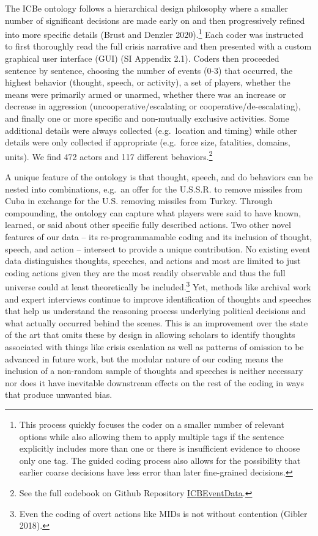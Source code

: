 \documentclass{article}
\begin{document}
The ICBe ontology follows a hierarchical design philosophy where a
smaller number of significant decisions are made early on and then
progressively refined into more specific details (Brust and Denzler
2020).\footnote{This process quickly focuses the coder on a smaller
  number of relevant options while also allowing them to apply multiple
  tags if the sentence explicitly includes more than one or there is
  insufficient evidence to choose only one tag. The guided coding
  process also allows for the possibility that earlier coarse decisions
  have less error than later fine-grained decisions.} Each coder was
instructed to first thoroughly read the full crisis narrative and then
presented with a custom graphical user interface (GUI) (SI Appendix
2.1). Coders then proceeded sentence by sentence, choosing the number of
events (0-3) that occurred, the highest behavior (thought, speech, or
activity), a set of players, whether the means were primarily armed or
unarmed, whether there was an increase or decrease in aggression
(uncooperative/escalating or cooperative/de-escalating), and finally one
or more specific and non-mutually exclusive activities. Some additional
details were always collected (e.g.~location and timing) while other
details were only collected if appropriate (e.g.~force size, fatalities,
domains, units). We find 472 actors and 117 different
behaviors.\footnote{See the full codebook on Github Repository
  \href{https://urldefense.com/v3/__https://github.com/CenterForPeaceAndSecurityStudies/ICBEventData__;!!Mih3wA!WxDJtEczKfxGTh0S2Krunap8ReymFEL5iTWaSfOHeqlSdyfRx77zmjBSWO1OAm13$}{ICBEventData}.}

A unique feature of the ontology is that thought, speech, and do
behaviors can be nested into combinations, e.g.~an offer for the
U.S.S.R. to remove missiles from Cuba in exchange for the U.S. removing
missiles from Turkey. Through compounding, the ontology can capture what
players were said to have known, learned, or said about other specific
fully described actions. Two other novel features of our data -- its
re-programmamable coding and its inclusion of thought, speech, and
action -- intersect to provide a unique contribution. No existing event
data distinguishes thoughts, speeches, and actions and most are limited
to just coding actions given they are the most readily observable and
thus the full universe could at least theoretically be
included.\footnote{Even the coding of overt actions like MIDs is not
  without contention (Gibler 2018).} Yet, methods like archival work and
expert interviews continue to improve identification of thoughts and
speeches that help us understand the reasoning process underlying
political decisions and what actually occurred behind the scenes. This
is an improvement over the state of the art that omits these by design
in allowing scholars to identify thoughts associated with things like
crisis escalation as well as patterns of omission to be advanced in
future work, but the modular nature of our coding means the inclusion of
a non-random sample of thoughts and speeches is neither necessary nor
does it have inevitable downstream effects on the rest of the coding in
ways that produce unwanted bias.
\end{document}
